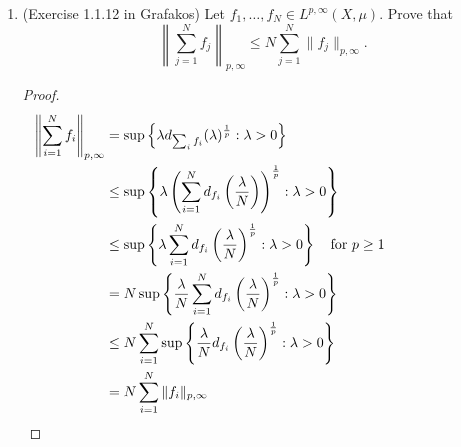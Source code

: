 \documentclass[a4paper]{article}
\begin{document}
\begin{enumerate}
\begin{proof}
\begin{enumerate}
        \item

          Let $f_n$ be the characteristic function of a rectangle of width $n$ and height $\frac{1}{n}$ centered at the origin. Then $\| f \|_1 = 1$.
          Take a point $(x_1, x_2)$ with $|x_2| \leq \frac{1}{2n}$ and $x_1 > 0$.. Then by taking a rectangle of height $\delta$ that contains $(x_1, x_2)$ and
          extends to the origin, we get
          \begin{align*}
            Mf(x_1,x_2) &= \sup_{R} \frac{1}{\mu(R)} \int_{R}^{} f d\mu \\
            &\geq \frac{1}{\delta x_1} \frac{n}{2} \delta \\
            &= \frac{n}{2 x_1}
          \end{align*}

          For a fixed $\lambda>0$, we then have $Mf(x_1,x_2) \geq \lambda$ if $x_1 \leq \frac{n}{2 \lambda}$. Therefore,
          \begin{align*}
          \end{align*}<++>

      \end{enumerate}

    \end{proof}

  \item (Exercise 1.1.12 in Grafakos) Let $f_1, \dots, f_N \in L^{p,\infty}(X,\mu)$. Prove that
    \[ \left\| \sum_{j=1}^N f_j \right\|_{p,\infty} \leq N \sum_{j=1}^N \| f_j \|_{p,\infty} .\]

    \begin{proof}

      \begin{align*}
        \left\| \sum_{i=1}^N f_i \right\|_{p,\infty} &= \sup \left\{ \lambda d_{\sum_i f_i}(\lambda)^{\frac{1}{p}} : \lambda>0 \right\} \\
        &\leq \sup \left\{ \lambda \left( \sum_{i=1}^N d_{f_i} \left( \frac{\lambda}{N} \right) \right)^{\frac{1}{p}} : \lambda>0 \right\} \\
        &\leq \sup \left\{ \lambda \sum_{i=1}^N d_{f_i} \left( \frac{\lambda}{N} \right)^{\frac{1}{p}} : \lambda >0 \right\} \quad \parbox{4cm}{for $p \geq 1$} \\
        &= N \sup \left\{ \frac{\lambda}{N} \sum_{i=1}^N d_{f_i} \left( \frac{\lambda}{N} \right)^\frac{1}{p} : \lambda > 0 \right\} \\
        &\leq N \sum_{i=1}^N \sup \left\{ \frac{\lambda}{N} d_{f_i} \left( \frac{\lambda}{N} \right)^\frac{1}{p} : \lambda>0 \right\} \\
        &= N \sum_{i=1}^N \|f_i\|_{p,\infty}
      \end{align*}


\end{proof}
\end{enumerate}
\end{document}
